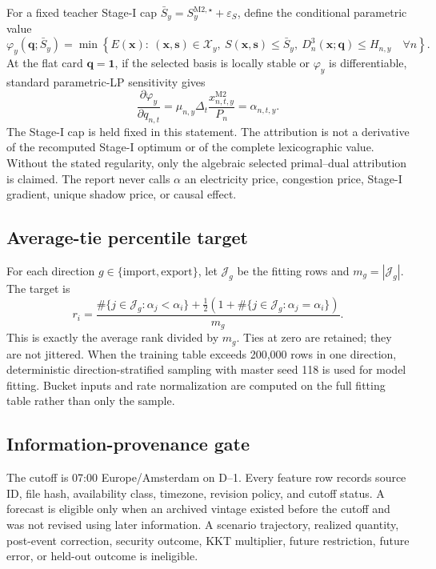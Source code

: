 \documentclass[10pt,journal,onecolumn]{IEEEtran}
\newcommand{\one}{\mathbf{1}}
\newcommand{\Mtwo}{\ensuremath{\mathrm{M2}}}
\begin{document}
For a fixed teacher Stage-I cap
$\bar S_y=S_y^{\Mtwo,\star}+\varepsilon_S$, define the conditional
parametric value
\begin{equation}
\varphi_y(\bm q;\bar S_y)
=\min\left\{E(\bm x):\ (\bm x,\bm s)\in\mathcal X_y,\ 
S(\bm x,\bm s)\leq\bar S_y,\ 
D_n^3(\bm x;\bm q)\leq H_{n,y}\quad\forall n\right\}.
\label{eq:report_conditional_value}
\end{equation}
At the flat card $\bm q=\one$, if the selected basis is locally stable or
$\varphi_y$ is differentiable, standard parametric-LP sensitivity gives
\cite{BonnansShapiro2000}
\begin{equation}
\frac{\partial\varphi_y}{\partial q_{n,t}}
=\mu_{n,y}\Delta_t\frac{x_{n,t,y}^{\Mtwo}}{P_n}=\alpha_{n,t,y}.
\end{equation}
The Stage-I cap is held fixed in this statement. The attribution is not a
derivative of the recomputed Stage-I optimum or of the complete lexicographic
value. Without the stated regularity, only the algebraic selected
primal--dual attribution is claimed. The report never calls $\alpha$ an
electricity price, congestion price, Stage-I gradient, unique shadow price, or
causal effect.

\subsection{Average-tie percentile target}

For each direction $g\in\{\mathrm{import},\mathrm{export}\}$, let
$\mathcal J_g$ be the fitting rows and $m_g=|\mathcal J_g|$. The target is
\begin{equation}
r_i
=\frac{\#\{j\in\mathcal J_g:\alpha_j<\alpha_i\}
+\tfrac12(1+\#\{j\in\mathcal J_g:\alpha_j=\alpha_i\})}{m_g}.
\label{eq:report_rank_target}
\end{equation}
This is exactly the average rank divided by $m_g$. Ties at zero are retained;
they are not jittered. When the training table exceeds 200,000 rows in one
direction, deterministic direction-stratified sampling with master seed 118
is used for model fitting. Bucket inputs and rate normalization are computed
on the full fitting table rather than only the sample.

\subsection{Information-provenance gate}

The cutoff is 07:00 Europe/Amsterdam on D--1. Every feature row records source
ID, file hash, availability class, timezone, revision policy, and cutoff status.
A forecast is eligible only when an archived vintage existed before the cutoff
and was not revised using later information. A scenario trajectory, realized
quantity, post-event correction, security outcome, KKT multiplier, future
restriction, future error, or held-out outcome is ineligible.
\end{document}
